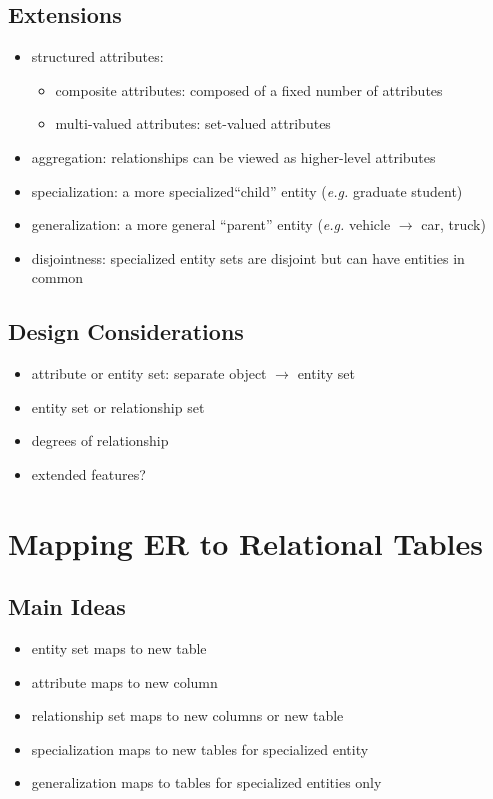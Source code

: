 \documentclass[]{article}
\theoremstyle{definition}
\begin{document}
	\subsection{Extensions}
	\begin{itemize}
		\item structured attributes:
			\begin{itemize}
				\item composite attributes: composed of a fixed number of attributes
				\item multi-valued attributes: set-valued attributes
			\end{itemize}
		\item aggregation: relationships can be viewed as higher-level attributes
		\item specialization: a more specialized``child'' entity (\textit{e.g.} graduate student)
		\item generalization: a more general ``parent'' entity (\textit{e.g.} vehicle $\rightarrow$ car, truck)
		\item disjointness: specialized entity sets are disjoint but can have entities in common
	\end{itemize}

	\subsection{Design Considerations}
	\begin{itemize}
		\item attribute or entity set: separate object $\rightarrow$ entity set
		\item entity set or relationship set
		\item degrees of relationship
		\item extended features?
	\end{itemize}

	\section{Mapping ER to Relational Tables}
	\subsection{Main Ideas}
	\begin{itemize}
		\item entity set maps to new table
		\item attribute maps to new column
		\item relationship set maps to new columns or new table
		\item specialization maps to new tables for specialized entity
		\item generalization maps to tables for specialized entities only
	\end{itemize}
\end{document}
